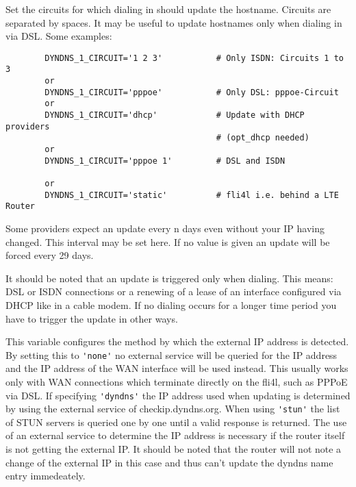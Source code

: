 \begin{description}
	{Set the circuits for which dialing in should update the hostname. 
	Circuits are separated by spaces. It may be useful to update
	hostnames only when dialing in via DSL.
	Some examples:

\begin{example}
\begin{verbatim}
        DYNDNS_1_CIRCUIT='1 2 3'           # Only ISDN: Circuits 1 to 3
        or
        DYNDNS_1_CIRCUIT='pppoe'           # Only DSL: pppoe-Circuit
        or
        DYNDNS_1_CIRCUIT='dhcp'            # Update with DHCP providers
                                           # (opt_dhcp needed)
        or
        DYNDNS_1_CIRCUIT='pppoe 1'         # DSL and ISDN

        or
        DYNDNS_1_CIRCUIT='static'          # fli4l i.e. behind a LTE Router

\end{verbatim}
\end{example}
	}
Some providers expect an update every n days even without your IP 
having changed. This interval may be set here. If no value is 
given an update will be forced every 29 days.

It should be noted that an update is triggered only when dialing. 
This means: DSL or ISDN connections or a renewing of a lease 
of an interface configured via DHCP like in a cable modem. If 
no dialing occurs for a longer time period you have to trigger 
the update in other ways.


This variable configures the method by which the external IP address
is detected. By setting this to \verb*?'none'? no external service will be
queried for the IP address and the IP address of the WAN interface will
be used instead. This usually works only with WAN connections
which terminate directly on the fli4l, such as PPPoE via DSL.
If specifying \verb*?'dyndns'? the IP address used when updating
is determined by using the external service of checkip.dyndns.org.
When using \verb*?'stun'? the list of STUN servers is queried one by
one until a valid response is returned. The use of an external service
to determine the IP address is necessary if the router itself is not
getting the external IP. It should be noted that the router will not note
a change of the external IP in this case and thus can't update the dyndns
name entry immedeately.


\end{description}

